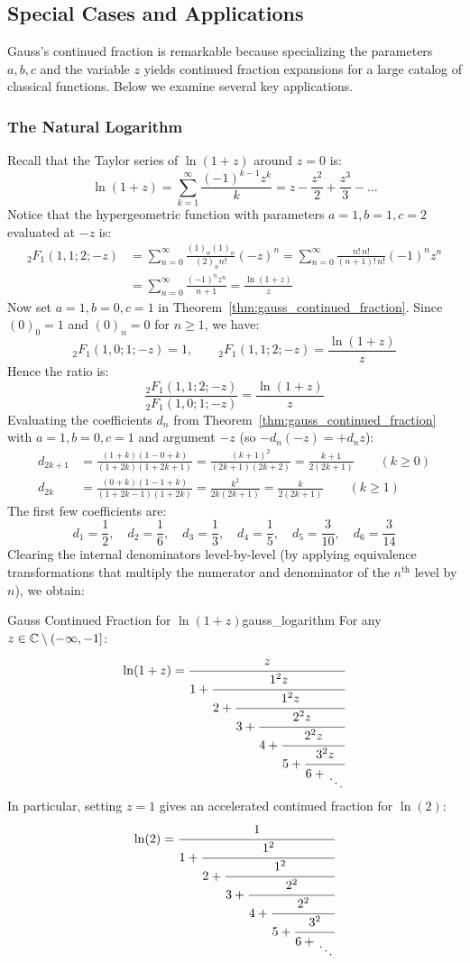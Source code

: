 \documentclass[a4paper]{article}
\begin{document}
\subsection{Special Cases and Applications}\label{cf:subsec:gauss-applications}
Gauss's continued fraction is remarkable because specializing the parameters $a, b, c$ and the variable $z$ yields continued fraction expansions for a large catalog of classical functions.
Below we examine several key applications.

\subsubsection{The Natural Logarithm}
Recall that the Taylor series of $\ln(1+z)$ around $z=0$ is:
\[
  \ln(1+z) = \sum_{k=1}^\infty \frac{(-1)^{k-1} z^k}{k} = z - \frac{z^2}{2} + \frac{z^3}{3} - \dots
\]
Notice that the hypergeometric function with parameters $a=1, b=1, c=2$ evaluated at $-z$ is:
\begin{align*}
  {_2F_1}(1, 1; 2; -z) & = \sum_{n=0}^\infty \frac{(1)_n (1)_n}{(2)_n n!} (-z)^n = \sum_{n=0}^\infty \frac{n! \, n!}{(n+1)! \, n!} (-1)^n z^n \\
  & = \sum_{n=0}^\infty \frac{(-1)^n z^n}{n+1} = \frac{\ln(1+z)}{z}
\end{align*}
Now set $a=1, b=0, c=1$ in Theorem~\ref{thm:gauss_continued_fraction}.
Since $(0)_0 = 1$ and $(0)_n = 0$ for $n \ge 1$, we have:
\[
  {_2F_1}(1, 0; 1; -z) = 1, \qquad {_2F_1}(1, 1; 2; -z) = \frac{\ln(1+z)}{z}
\]
Hence the ratio is:
\[
  \frac{{_2F_1}(1, 1; 2; -z)}{{_2F_1}(1, 0; 1; -z)} = \frac{\ln(1+z)}{z}
\]
Evaluating the coefficients $d_n$ from Theorem~\ref{thm:gauss_continued_fraction} with $a=1, b=0, c=1$ and argument $-z$ (so $-d_n(-z) = + d_n z$):
\begin{align*}
  d_{2k+1} & = \frac{(1+k)(1-0+k)}{(1+2k)(1+2k+1)} = \frac{(k+1)^2}{(2k+1)(2k+2)} = \frac{k+1}{2(2k+1)} \qquad (k \ge 0) \\
  d_{2k}   & = \frac{(0+k)(1-1+k)}{(1+2k-1)(1+2k)} = \frac{k^2}{2k(2k+1)} = \frac{k}{2(2k+1)} \qquad (k \ge 1)
\end{align*}
The first few coefficients are:
\[
  d_1 = \frac{1}{2}, \quad d_2 = \frac{1}{6}, \quad d_3 = \frac{1}{3}, \quad d_4 = \frac{1}{5}, \quad d_5 = \frac{3}{10}, \quad d_6 = \frac{3}{14}
\]
Clearing the internal denominators level-by-level (by applying equivalence transformations that multiply the numerator and denominator of the $n^{\text{th}}$ level by $n$), we obtain:

\begin{mylemma}{Gauss Continued Fraction for \texorpdfstring{$\ln(1+z)$}{ln(1+z)}}{gauss_logarithm}
  For any $z \in \mathbb{C} \setminus (-\infty, -1]$:
  \[
    \ln(1+z) = \cfrac{z}{1 + \cfrac{1^2 z}{2 + \cfrac{1^2 z}{3 + \cfrac{2^2 z}{4 + \cfrac{2^2 z}{5 + \cfrac{3^2 z}{6 + \CFDots}}}}}}
  \]
  In particular, setting $z=1$ gives an accelerated continued fraction for $\ln(2)$:
  \[
    \ln(2) = \cfrac{1}{1 + \cfrac{1^2}{2 + \cfrac{1^2}{3 + \cfrac{2^2}{4 + \cfrac{2^2}{5 + \cfrac{3^2}{6 + \CFDots}}}}}}
  \]
\end{mylemma}
\end{document}
